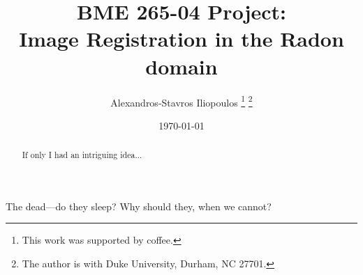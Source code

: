 \documentclass[twoside]{IEEEtran}
\title{{\Large BME 265-04 Project:}\\
  Image Registration in the Radon domain}
\author{Alexandros-Stavros Iliopoulos%
  \thanks{This work was supported by coffee.}%
  \thanks{The author is with Duke University, Durham, NC 27701.}}
\date{\today}
\numberwithin{equation}{section}
\numberwithin{figure}{section}
\numberwithin{table}{section}
\numberwithin{prog}{section}
\begin{document}
\maketitle


\begin{abstract}
  If only I had an intriguing idea...
\end{abstract}


The dead---do they sleep? Why should they, when we cannot?






% 
\end{document}
